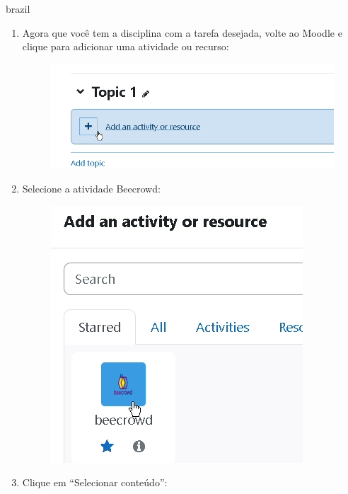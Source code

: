 \begin{otherlanguage*}{brazil}
\begin{enumerate}
    \item Agora que você tem a disciplina com a tarefa desejada, volte ao Moodle e clique para adicionar uma atividade ou recurso:

    \begin{figure}[H]
        \centering
            \includegraphics[scale=0.3]{pictures/apendices/apendice_b_10.png}
    \end{figure}

    \item Selecione a atividade Beecrowd:

    \begin{figure}[H]
        \centering
            \includegraphics[scale=0.45]{pictures/apendices/apendice_b_11.png}
    \end{figure}

    \item Clique em “Selecionar conteúdo”:


\end{enumerate}
\end{otherlanguage*}
